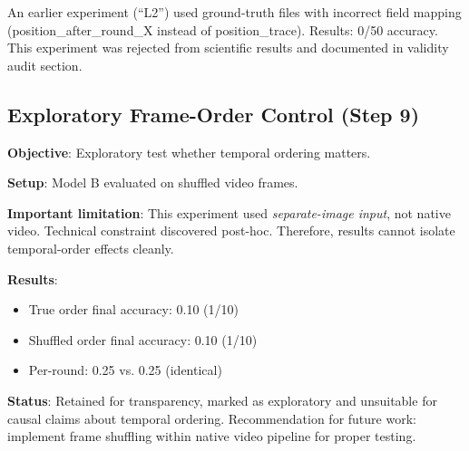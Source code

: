 An earlier experiment (``L2'') used ground-truth files with incorrect field mapping (position\_after\_round\_X instead of position\_trace). Results: 0/50 accuracy. This experiment was rejected from scientific results and documented in validity audit section.

\subsection{Exploratory Frame-Order Control (Step 9)}

\textbf{Objective}: Exploratory test whether temporal ordering matters.

\textbf{Setup}: Model B evaluated on shuffled video frames.

\textbf{Important limitation}: This experiment used \emph{separate-image input}, not native video. Technical constraint discovered post-hoc. Therefore, results cannot isolate temporal-order effects cleanly.

\textbf{Results}:
\begin{itemize}
    \item True order final accuracy: 0.10 (1/10)
    \item Shuffled order final accuracy: 0.10 (1/10)
    \item Per-round: 0.25 vs. 0.25 (identical)
\end{itemize}

\textbf{Status}: Retained for transparency, marked as exploratory and unsuitable for causal claims about temporal ordering. Recommendation for future work: implement frame shuffling within native video pipeline for proper testing.
